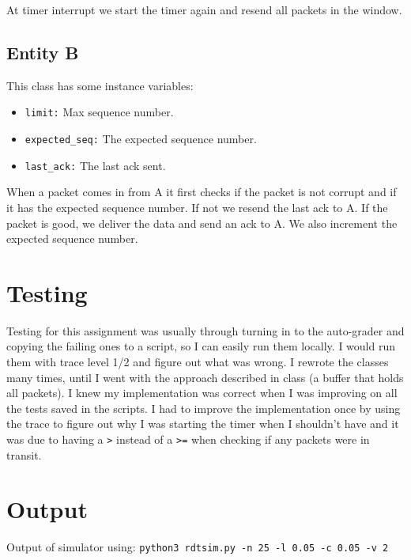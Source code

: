\documentclass{article}
\begin{document}
\noindent At timer interrupt we start the timer again and resend all packets in
the window. \\


\subsection{Entity B}
This class has some instance variables:
\begin{itemize}
\item \texttt{limit:} Max sequence number.
\item \texttt{expected\_seq:} The expected sequence number.
\item \texttt{last\_ack:} The last ack sent.
\end{itemize}

\noindent When a packet comes in from A it first checks if the packet is not corrupt and if it has the expected sequence number. If not we resend the last ack to A. If the packet is good, we deliver the data and send an ack to A. We also increment the expected sequence number. \\

\section{Testing}
Testing for this assignment was usually through turning in to the auto-grader
and copying the failing ones to a script, so I can easily run them locally. I
would run them with trace level 1/2 and figure out what was wrong. I rewrote the
classes many times, until I went with the approach described in class (a buffer
that holds all packets). I knew my implementation was correct when I was
improving on all the tests saved in the scripts. I had to improve the
implementation once by using the trace to figure out why I was starting the
timer when I shouldn't have and it was due to having a \texttt{>} instead of a
\texttt{>=} when checking if any packets were in transit.

\section{Output}
Output of simulator using: \texttt{python3 rdtsim.py -n 25 -l 0.05 -c 0.05 -v 2}
\end{document}
